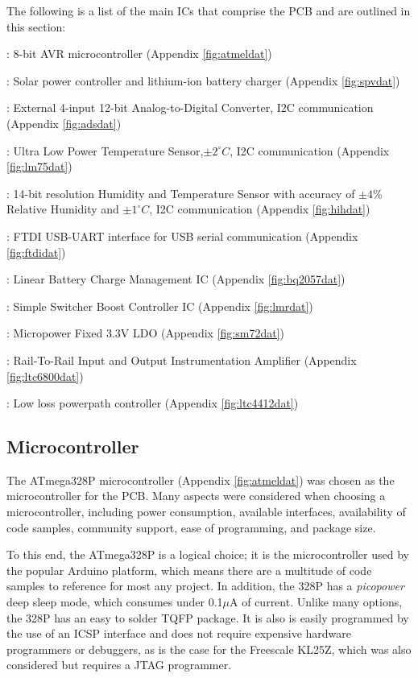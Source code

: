 \documentclass{article}
\numberwithin{figure}{section}
\numberwithin{equation}{section}
\begin{document}
{\bigskip
The following is a list of the main ICs that comprise the PCB and are outlined in this section:
\begin{description}[font=$\bullet$\scshape\bfseries]
\item[Atmel ATMega328P]: 8-bit AVR microcontroller (Appendix \ref{fig:atmeldat})
\item[SPV1040 Max Point Power Tracker]: Solar power controller and lithium-ion battery charger (Appendix \ref{fig:spvdat})
\item[ADS1015]: External 4-input 12-bit Analog-to-Digital Converter, I2C communication (Appendix \ref{fig:adsdat})
\item[LM75BD]: Ultra Low Power Temperature Sensor,$\pm 2^{\circ}C$, I2C communication (Appendix \ref{fig:lm75dat})
\item[(Optional) HIH6130]: 14-bit resolution Humidity and Temperature Sensor with accuracy of $\pm4$\% Relative Humidity and $\pm 1^{\circ}C$, I2C communication (Appendix \ref{fig:hihdat})
\item[FT230X]: FTDI USB-UART interface for USB serial communication (Appendix \ref{fig:ftdidat})
\item[BQ2057CTS]: Linear Battery Charge Management IC (Appendix \ref{fig:bq2057dat})
\item[LM61428]: Simple Switcher Boost Controller IC (Appendix \ref{fig:lmrdat})
\item[SM72238]: Micropower Fixed 3.3V LDO (Appendix \ref{fig:sm72dat})
\item[LTC6800]: Rail-To-Rail Input and Output Instrumentation Amplifier (Appendix \ref{fig:ltc6800dat})
\item[LTC4412]: Low loss powerpath controller (Appendix \ref{fig:ltc4412dat})
\end{description}

\subsection{Microcontroller} \label{sect:micro_just}
The ATmega328P microcontroller (Appendix \ref{fig:atmeldat}) was chosen as the microcontroller for the PCB. Many aspects were considered when choosing a microcontroller, including power consumption, available interfaces, availability of code samples, community support, ease of programming, and package size.

\bigskip
To this end, the ATmega328P is a logical choice; it is the microcontroller used by the popular Arduino platform, which means there are a multitude of code samples to reference for most any project. In addition, the 328P has a \textit{picopower} deep sleep mode, which consumes under 0.1$\mu$A of current. Unlike many options, the 328P has an easy to solder TQFP package. It is also is easily programmed by the use of an ICSP interface and does not require expensive hardware programmers or debuggers, as is the case for the Freescale KL25Z, which was also considered but requires a JTAG programmer.

}
\end{document}
